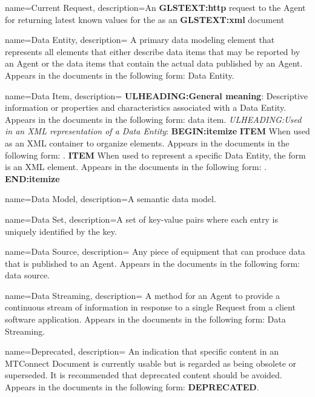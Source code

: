 {
    name={Current Request},
	description={An \textbf{GLSTEXT:http} request to the \gls{Agent} for returning latest known values for the  as an  \textbf{GLSTEXT:xml} document}
}

{
    name={Data Entity},
	description={
	A primary data modeling element that represents all elements that either describe data items that may be reported by an \gls{Agent} or the data items that contain the actual data published by an \gls{Agent}.
	Appears in the documents in the following form: \gls{Data Entity}.
}
}

{
    name={Data Item},
	description={
	\textbf{ULHEADING:General meaning}:
	Descriptive information or properties and characteristics associated with a \gls{Data Entity}.
	Appears in the documents in the following form: data item.
	\textit{ULHEADING:Used in an XML representation of a \gls{Data Entity}}:
    \textbf{BEGIN:itemize}
	\textbf{ITEM} When used as an XML container to organize  elements.
	Appears in the documents in the following form: .
	\textbf{ITEM} When used to represent a specific \gls{Data Entity}, the form  is an XML element.  
	Appears in the documents in the following form: .
    \textbf{END:itemize}
}
}

{
    name={Data Model},
	description={A \gls{semantic data model}.}
}

{
    name={Data Set},
	description={A set of \glspl{key-value pair} where each entry is uniquely identified by the \gls{key}.}
}

{
    name={Data Source},
	description={
	Any piece of equipment that can produce data that is published to an \gls{Agent}.
	Appears in the documents in the following form: data source.
}
}

{
    name={Data Streaming},
	description={
	A method for an \gls{Agent} to provide a continuous stream of information in response to a single \gls{Request} from a client software application.
	Appears in the documents in the following form: \gls{Data Streaming}.
}
}

{
    name={Deprecated},
	description={
	An indication that specific content in an \gls{MTConnect Document} is currently usable but is regarded as being obsolete or superseded. It is recommended that deprecated content should be avoided.
	Appears in the documents in the following form: \textbf{DEPRECATED}.
}
}

